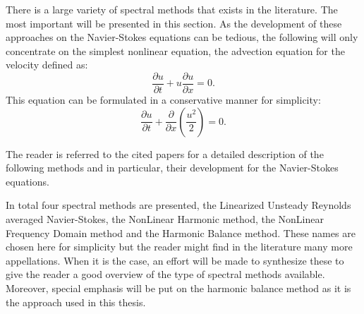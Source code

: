 
There is a large variety of spectral methods that exists in the
literature. The most important will be presented in this section.
As the development of these approaches on the Navier-Stokes equations
can be tedious, the following will only concentrate on the simplest
nonlinear equation, the advection equation for the velocity
defined as:
\begin{equation}
	\frac{\partial u}{\partial t} + 
	u \frac{\partial u}{\partial x} = 
	0.
	\label{eq:sm_nonlinear_convection}
\end{equation}
This equation can be formulated in a conservative manner for simplicity:
\begin{equation}
	\frac{\partial u}{\partial t} + 
	\frac{\partial}{\partial x} \left( \frac{u^2}{2} \right) = 
	0.
	\label{eq:sm_nonlinear_convection_conservative}
\end{equation}

The reader is referred to the cited papers for a detailed description
of the following methods and in particular, their
development for the Navier-Stokes equations. 

In total four spectral methods are presented, 
the Linearized Unsteady Reynolds averaged
Navier-Stokes, the NonLinear Harmonic method, the NonLinear Frequency Domain
method and the Harmonic Balance method.  
These names are chosen here
for simplicity but the reader might find in the literature many more
appellations. When it is the case, an effort will be made to synthesize
these to give the reader a good overview of the type of spectral methods available. 
Moreover, special emphasis will be put on the harmonic
balance method as it is the approach used in this thesis.

